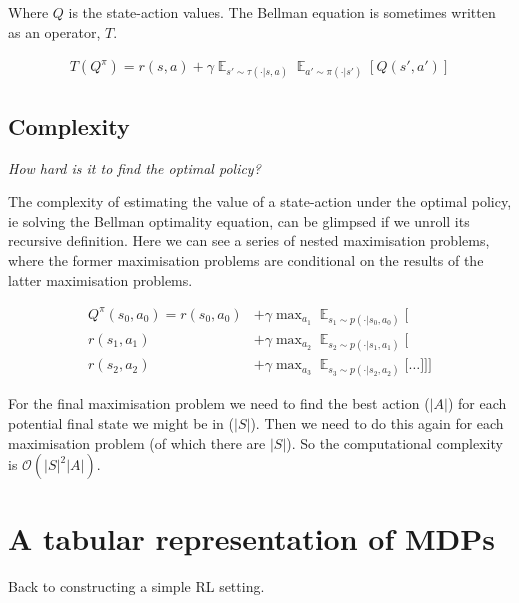 Where $Q$ is the state-action values.
The Bellman equation is sometimes written as an operator, $T$.

\begin{align*}
T(Q^{\pi}) = r(s, a) + \gamma \mathop{\mathbb E}_{s' \sim \tau(\cdot|s, a)}\mathop{\mathbb E}_{a'\sim \pi(\cdot | s')} [Q(s', a')]
\end{align*}

\subsection{Complexity}

\begin{displayquote}
  \textsl{How hard is it to find the optimal policy?}
\end{displayquote}

The complexity of estimating the value of a state-action under the optimal policy, ie solving the Bellman optimality
equation, can be glimpsed if we unroll its recursive definition.
Here we can see a series of nested maximisation problems, where the former
maximisation problems are conditional on the results of the latter maximisation problems.

\begin{align*}
Q^{\pi}(s_0, a_0) = r(s_0, a_0) &+ \gamma \mathop{\text{max}}_{a_1} \mathop{\mathbb E}_{s_1\sim p(\cdot | s_0, a_0)} \Bigg[ \\
r(s_1, a_1)  &+ \gamma \mathop{\text{max}}_{a_2} \mathop{\mathbb E}_{s_2\sim p(\cdot | s_1, a_1)} \bigg[\\
r(s_2, a_2)  &+ \gamma \mathop{\text{max}}_{a_3} \mathop{\mathbb E}_{s_3\sim p(\cdot | s_2, a_2)} \Big[
\dots \Big] \bigg] \Bigg]
\end{align*}


For the final maximisation problem we need to find the best action ($|A|$) for each potential final state we might be in ($|S|$).
Then we need to do this again for each maximisation problem (of which there are $|S|$).
So the computational complexity is $\mathcal O(|S|^2|A|)$.

\section{A tabular representation of MDPs}

Back to constructing a simple RL setting.

